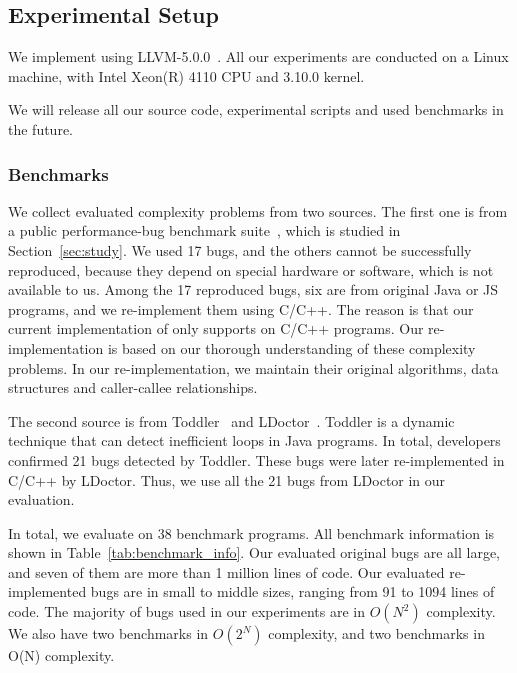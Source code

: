 \subsection{Experimental Setup}

We implement \Tool using LLVM-5.0.0~\cite{llvm}. 
All our experiments are conducted on a Linux machine, 
with Intel Xeon(R) 4110 CPU and 3.10.0 kernel.

We will release all our source code, experimental scripts 
and used benchmarks in the future. 




\subsubsection{Benchmarks}

We collect evaluated complexity problems from two sources. 
The first one is
from a public performance-bug benchmark 
suite~\cite{PerfBug,SongOOPSLA2014,ldoctor}, which is
studied in Section~\ref{sec:study}.
We used 17 bugs, and the others cannot be successfully
reproduced, because they depend on special hardware 
or software, which is not available to us. 
Among the 17 reproduced bugs, six are from
original Java or JS programs, 
and we re-implement them using C/C++.
The reason is that our current implementation of \Tool 
only supports on C/C++ programs.
Our re-implementation is based on our thorough 
understanding of these complexity problems.
In our re-implementation, we maintain 
their original algorithms, 
data structures and caller-callee relationships. 


The second source is from Toddler~\cite{Alabama} and LDoctor~\cite{ldoctor}. 
Toddler is a dynamic technique that can detect inefficient loops in Java programs.
In total, developers confirmed 21 bugs detected by Toddler. 
These bugs were later re-implemented in C/C++ by LDoctor. 
Thus, we use all the 21 bugs from LDoctor in our evaluation.  


In total, we evaluate \Tool on 38 benchmark programs. 
All benchmark information is shown in Table~\ref{tab:benchmark_info}. 
Our evaluated original bugs are all large, and seven of them 
are more than 1 million lines of code.
Our evaluated re-implemented bugs are in small to middle sizes, 
ranging from 91 to 1094 lines of code. 
The majority of bugs used in our experiments are in $O(N^2)$ complexity. 
We also have two benchmarks in $O(2^N)$ complexity, 
and two benchmarks in O(N) complexity.

